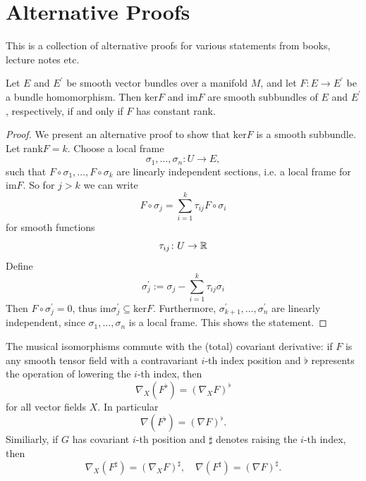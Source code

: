 \section{Alternative Proofs}

This is a collection of alternative proofs for various statements from books, lecture notes etc.

\begin{theorem}
    Let $E$ and $E^\prime$ be smooth vector bundles over a manifold $M$, and let $F \colon E \to E^\prime$ be a bundle homomorphism. Then $\mathrm{ker} F$ and $\mathrm{im} F$ are smooth subbundles of $E$ and $E^\prime$, respectively, if and only if $F$ has constant rank.
\end{theorem}
\begin{proof}
    We present an alternative proof to show that $\mathrm{ker} F$ is a smooth subbundle. Let $\mathrm{rank} F = k$. Choose a local frame $$\sigma_1,\ldots,\sigma_n \colon U \to E,$$ such that $F\circ \sigma_1, \ldots, F \circ \sigma_k$ are linearly independent sections, i.e. a local frame for $\mathrm{im}F$. So for $j > k$ we can write
    \[
    F \circ \sigma_j = \sum_{i = 1}^k \tau_{ij} F \circ \sigma_i
    \]
    for smooth functions \[
    \tau_{ij} \colon U \to \mathbb{R}
    \]
    Define 
    \[
    \sigma_j^\prime := \sigma_j - \sum _{i=1}^k \tau_{ij} \sigma_i
    \]
    Then $F \circ \sigma_j^\prime = 0$, thus $\mathrm{im}\sigma_j^\prime \subseteq \mathrm{ker}F$. Furthermore, $\sigma_{k+1}^\prime,\ldots,\sigma_n^\prime$ are linearly independent, since $\sigma_1,\ldots,\sigma_n$ is a local frame. This shows the statement.
\end{proof}

\begin{proposition}
    The musical isomorphisms commute with the (total) covariant derivative: if $F$ is any smooth tensor field with a contravariant $i$-th index position and $\flat$ represents the operation of lowering the $i$-th index, then 
    \begin{equation}
        \label{section_alt_proofs:eq:musical_isomorphisms_and_derivative1}
        \nabla_X(F^\flat) = (\nabla_X F)^\flat
    \end{equation}
    for all vector fields $X$. In particular 
    \begin{equation}
        \label{section_alt_proofs:eq:musical_isomorphisms_and_derivative2}
        \nabla (F^\flat) = (\nabla F)^\flat.  
    \end{equation}
    Similiarly, if $G$ has covariant $i$-th position and $\sharp$ denotes raising the $i$-th index, then 
    \begin{equation}
        \label{section_alt_proofs:eq:musical_isomorphisms_and_derivative3}
        \nabla_X(F^\sharp) = (\nabla_X F)^\sharp, \quad  \nabla(F^\sharp) = (\nabla F)^\sharp.
    \end{equation}
\end{proposition}

